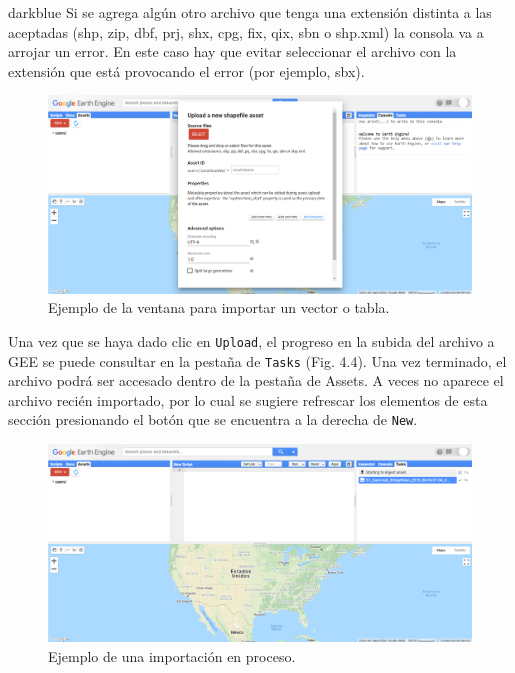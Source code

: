 \documentclass[
  12pt,
  letterpaper,
  twoside]{book}
\begin{document}
\begin{bluebox2}

\begin{awesomeblock}{5pt}{\faLightbulb}{darkblue}
Si se agrega algún otro archivo que tenga una extensión distinta a las aceptadas (shp, zip, dbf, prj, shx, cpg, fix, qix, sbn o shp.xml) la consola va a arrojar un error. En este caso hay que evitar seleccionar el archivo con la extensión que está provocando el error (por ejemplo, sbx).

\end{awesomeblock}

\end{bluebox2}

\begin{figure}[btp]

{\centering \includegraphics[width=1\linewidth]{Img/Asset2} 

}

\caption{Ejemplo de la ventana para importar un vector o tabla.}\label{fig:unnamed-chunk-38}
\end{figure}

Una vez que se haya dado clic en \texttt{Upload}, el progreso en la subida del archivo a GEE se puede consultar en la pestaña de \texttt{Tasks} (Fig. 4.4). Una vez terminado, el archivo podrá ser accesado dentro de la pestaña de Assets. A veces no aparece el archivo recién importado, por lo cual se sugiere refrescar los elementos de esta sección presionando el botón que se encuentra a la derecha de \texttt{New}.

\begin{figure}[btp]

{\centering \includegraphics[width=1\linewidth]{Img/Asset3} 

}

\caption{Ejemplo de una importación en proceso.}\label{fig:unnamed-chunk-39}
\end{figure}
\end{document}
